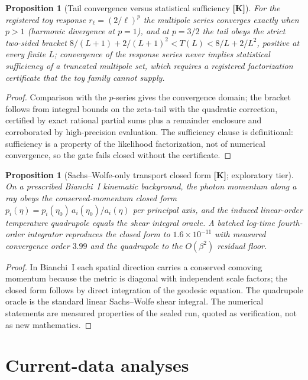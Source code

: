 \documentclass[10pt]{article}
\newtheorem{proposition}[theorem]{Proposition}
\theoremstyle{definition}
\newcommand{\tier}[1]{\textbf{[#1]}}
\begin{document}
\begin{proposition}[Tail convergence versus statistical sufficiency
\tier{K}]
For the registered toy response $r_\ell = (2/\ell)^p$ the multipole
series converges exactly when $p > 1$ (harmonic divergence at
$p = 1$), and at $p = 3/2$ the tail obeys the strict two-sided
bracket $8/(L{+}1) + 2/(L{+}1)^2 < T(L) < 8/L + 2/L^2$, positive at
every finite $L$; convergence of the response series never implies
statistical sufficiency of a truncated multipole set, which requires
a registered factorization certificate that the toy family cannot
supply.
\end{proposition}
\begin{proof}
Comparison with the $p$-series gives the convergence domain; the
bracket follows from integral bounds on the zeta-tail with the
quadratic correction, certified by exact rational partial sums plus a
remainder enclosure and corroborated by high-precision evaluation.
The sufficiency clause is definitional: sufficiency is a property of
the likelihood factorization, not of numerical convergence, so the
gate fails closed without the certificate.
\end{proof}

\begin{proposition}[Sachs--Wolfe-only transport closed form \tier{K};
exploratory tier]
On a prescribed Bianchi~I kinematic background, the photon momentum
along a ray obeys the conserved-momentum closed form
$p_i(\eta) = p_i(\eta_0)\, a_i(\eta_0)/a_i(\eta)$ per principal axis,
and the induced linear-order temperature quadrupole equals the shear
integral oracle. A batched log-time fourth-order integrator reproduces
the closed form to $1.6\times10^{-11}$ with measured convergence order
$3.99$ and the quadrupole to the $O(\beta^2)$ residual floor.
\end{proposition}
\begin{proof}
In Bianchi~I each spatial direction carries a conserved comoving
momentum because the metric is diagonal with independent scale
factors; the closed form follows by direct integration of the
geodesic equation. The quadrupole oracle is the standard linear
Sachs--Wolfe shear integral. The numerical statements are measured
properties of the sealed run, quoted as verification, not as new
mathematics.
\end{proof}

\section{Current-data analyses}
\label{sec:data}
\end{document}
